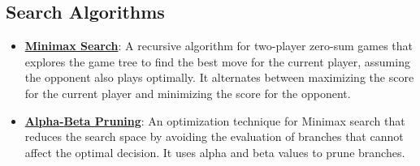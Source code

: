 \documentclass{article}%
\begin{document}
\subsection{Search Algorithms}%
\label{subsec:SearchAlgorithms}%
\begin{itemize}[leftmargin=*]%
\item \href{https://purdue.brightspace.com/d2l/common/assets/pdfjs-d2l-dist/1.0.14-legacy/web/viewer.html?file=\%2Fcontent\%2Fenforced\%2F1095467-wl.202510.CS.24300.001\%2F02L2-Intro.pdf\%3Fou\%3D1095467\&lang=en-us\&container=d2l-fileviewer-rendered-pdf\&fullscreen=d2l-fileviewer-rendered-pdf-dialog\&height=667#page=22}{\textbf{Minimax Search}}: A recursive algorithm for two{-}player zero{-}sum games that explores the game tree to find the best move for the current player, assuming the opponent also plays optimally. It alternates between maximizing the score for the current player and minimizing the score for the opponent.%
\item \href{https://purdue.brightspace.com/d2l/common/assets/pdfjs-d2l-dist/1.0.14-legacy/web/viewer.html?file=\%2Fcontent\%2Fenforced\%2F1095467-wl.202510.CS.24300.001\%2F02L2-Intro.pdf\%3Fou\%3D1095467\&lang=en-us\&container=d2l-fileviewer-rendered-pdf\&fullscreen=d2l-fileviewer-rendered-pdf-dialog\&height=667#page=23}{\textbf{Alpha{-}Beta Pruning}}: An optimization technique for Minimax search that reduces the search space by avoiding the evaluation of branches that cannot affect the optimal decision. It uses alpha and beta values to prune branches.%
\end{itemize}

%
\end{document}
